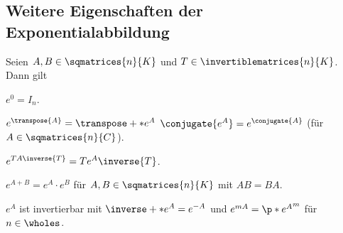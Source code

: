 \subsection*{Weitere Eigenschaften der Exponentialabbildung}
\begin{lemma}
  Seien \( A,B\in \sqmatrices{n}{K} \) und \( T\in \invertiblematrices{n}{K} \). Dann gilt
  \begin{eigenschaftenenumerate}
    \item \label{exponentialabbildung:identitaet} \( e^0=I_n \).
    \item \label{transponiert_konjugiert_funzt_mit_exponentialabbildung} \( e^{\transpose{A}}=\transpose+*{e^A} \) \bzw \( \conjugate{e^A}=e^{\conjugate{A}} \) (für \( A\in \sqmatrices{n}{C} \)).
    \item \label{basiswechsel_funzt_mit_exponentialabbildung} \( e^{TA\inverse{T}}=Te^A\inverse{T} \).
    \item \label{exponentialregel_funzt_mit_exponentialabbildung} \( e^{A+B}=e^{A}\cdot e^{B} \) für \( A,B\in \sqmatrices{n}{K} \) mit \( AB=BA \).
    \item \label{exponentialabbildung:inverses} \( e^A \) ist invertierbar mit \( \inverse+*{e^A}=e^{-A} \) und \( e^{mA}=\p*{e^A}^m \) für \( n\in \wholes \).
  \end{eigenschaftenenumerate}
\end{lemma}
